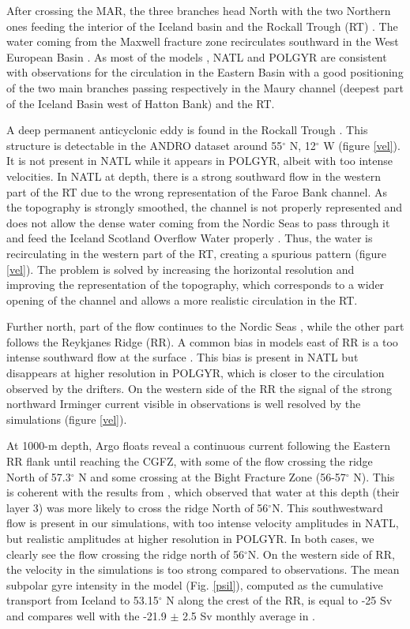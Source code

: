 \documentclass{ametsoc}
\begin{document}
After crossing the MAR, the three branches head North with the two Northern ones feeding the interior of the Iceland basin and the Rockall Trough (RT) \citep{daniault2016}. The water coming from the Maxwell fracture zone recirculates southward in the West European Basin \citep{paillet1997}. As most of the models \citep{treguier2005,deshayes2007}, NATL and POLGYR are consistent with observations for the circulation in the Eastern Basin  with a good positioning of the two main branches passing respectively in the Maury channel (deepest part of the Iceland Basin west of Hatton Bank) and the RT. 

A deep permanent anticyclonic eddy is found in the Rockall Trough \citep{fisher2018,smilenova,lecorre2019}. This structure is detectable in the ANDRO dataset around 55$^{\circ}$ N, 12$^{\circ}$ W (figure \ref{vel}). It is not present in NATL while it appears in POLGYR, albeit with too intense velocities. In NATL at depth, there is a strong southward flow in the western part of the RT due to the wrong representation of the Faroe Bank channel. As the topography is strongly smoothed, the channel is not properly represented and does not allow the dense water coming from the Nordic Seas to pass through it and feed the Iceland Scotland Overflow Water properly \citep{hansen2016,kanzow2014}. Thus, the water is recirculating in the western part of the RT, creating a spurious pattern (figure \ref{vel}). The problem is solved by increasing the horizontal resolution and improving the representation of the topography, which corresponds to a wider opening of the channel and allows a more realistic circulation in the RT. 


Further north, part of the flow continues to the Nordic Seas \citep{rossby2012}, while the other part follows the Reykjanes Ridge (RR). A common bias in models east of RR is a too intense southward flow at the surface \citep{treguier2005}. This bias is present in NATL but disappears at higher resolution in POLGYR, which is closer to the circulation observed by the drifters. On the western side of the RR the signal of the strong northward Irminger current visible in observations is well resolved by the simulations (figure \ref{vel}). 

At 1000-m depth, Argo floats reveal a continuous current following the Eastern RR flank until reaching the CGFZ, with some of the flow crossing the ridge North of 57.3$^{\circ}$ N and some crossing at the Bight Fracture Zone (56-57$^{\circ}$ N). This is coherent with the results from \citet{petit2018}, which observed that water at this depth (their layer 3) was more likely to cross the ridge North of 56$^{\circ}$N. This southwestward flow is present in our simulations, with too intense velocity amplitudes in NATL, but realistic amplitudes at higher resolution in POLGYR. In both cases, we clearly see the flow crossing the ridge north of 56$^{\circ}$N. On the western side of RR, the velocity in the simulations is too strong compared to observations.
The mean subpolar gyre intensity in the model (Fig. \ref{psil}), computed as the cumulative transport from Iceland to 53.15$^{\circ}$ N along the crest of the RR, is equal to -25 Sv and compares well with the -21.9 $\pm$ 2.5 Sv monthly average in \citet{petit2018}.  
\end{document}
